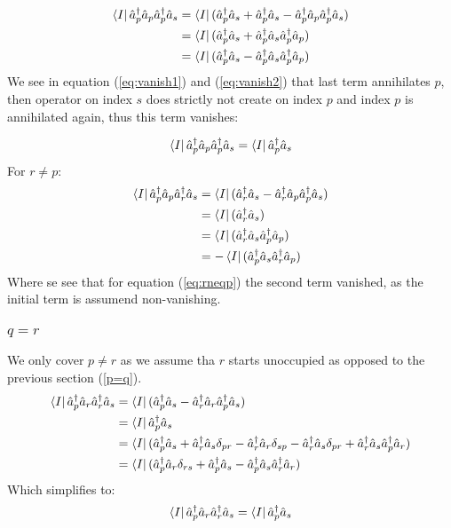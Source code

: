 \documentclass[12p]{article}
\begin{document}
\begin{align}
    \bra{I} \hat{a}^\dagger_p \hat{a}_p \hat{a}^\dagger_p \hat{a}_s & =   \bra{I} (\hat{a}^\dagger_p \hat{a}_s + \hat{a}^\dagger_p \hat{a}_s - \hat{a}^\dagger_p \hat{a}_p \hat{a}^\dagger_p \hat{a}_s ) \\
  & =   \bra{I} (\hat{a}^\dagger_p \hat{a}_s + \hat{a}^\dagger_p \hat{a}_s \hat{a}^\dagger_p \hat{a}_p) \label{eq:vanish1} \\
  & =   \bra{I} (\hat{a}^\dagger_p \hat{a}_s - \hat{a}^\dagger_p \hat{a}_s \hat{a}^\dagger_p \hat{a}_p) \label{eq:vanish2}
\end{align}
We see in equation (\ref{eq:vanish1}) and (\ref{eq:vanish2}) that last term annihilates $p$, then operator on index $s$ does strictly not create on index $p$ and index $p$ is annihilated again, thus this term vanishes:

\begin{equation}
 \bra{I}  \hat{a}^\dagger_p \hat{a}_p \hat{a}^\dagger_p \hat{a}_s = \bra{I} \hat{a}^\dagger_p \hat{a}_s
\end{equation}
For $r \neq p$:
\begin{align}
    \bra{I} \hat{a}^\dagger_p \hat{a}_p \hat{a}^\dagger_r \hat{a}_s & =   \bra{I} ( \hat{a}^\dagger_r  \hat{a}_s - \hat{a}^\dagger_r \hat{a}_p \hat{a}^\dagger_p \hat{a}_s ) \nonumber \\
  & =   \bra{I} (\hat{a}^\dagger_r  \hat{a}_s) \label{eq:rneqp}\\
  & =   \bra{I} ( \hat{a}^\dagger_r \hat{a}_s \hat{a}^\dagger_p \hat{a}_p) \\
  & = -   \bra{I} (\hat{a}^\dagger_p \hat{a}_s \hat{a}^\dagger_r \hat{a}_p)
\end{align}
Where se see that for equation (\ref{eq:rneqp}) the second term vanished, as the initial term is assumend non-vanishing.

\subsubsection{$q=r$}
We only cover $p \neq r$ as we assume tha $r$ starts unoccupied as opposed to the previous section (\ref{p=q}).
\begin{align}
  \bra{I} \hat{a}^\dagger_p \hat{a}_r \hat{a}^\dagger_r \hat{a}_s & =   \bra{I} (\hat{a}^\dagger_p \hat{a}_s - \hat{a}^\dagger_r \hat{a}_r \hat{a}^\dagger_p \hat{a}_s) \nonumber \\
  & =   \bra{I} \hat{a}^\dagger_p \hat{a}_s  \\
  & =   \bra{I} (\hat{a}^\dagger_p \hat{a}_s + \hat{a}^\dagger_r \hat{a}_s \delta_{pr} - \hat{a}^\dagger_r \hat{a}_r  \delta_{sp} - \hat{a}^\dagger_r \hat{a}_s \delta_{pr} + \hat{a}^\dagger_r \hat{a}_s \hat{a}^\dagger_p \hat{a}_r) \\
  & =   \bra{I} (\hat{a}^\dagger_p \hat{a}_r \delta_{rs} + \hat{a}^\dagger_p \hat{a}_s - \hat{a}^\dagger_p \hat{a}_s \hat{a}^\dagger_r \hat{a}_r)
\end{align}
Which simplifies to:
\begin{equation}
    \bra{I} \hat{a}^\dagger_p \hat{a}_r \hat{a}^\dagger_r \hat{a}_s =   \bra{I} \hat{a}^\dagger_p \hat{a}_s
\end{equation}
\end{document}

